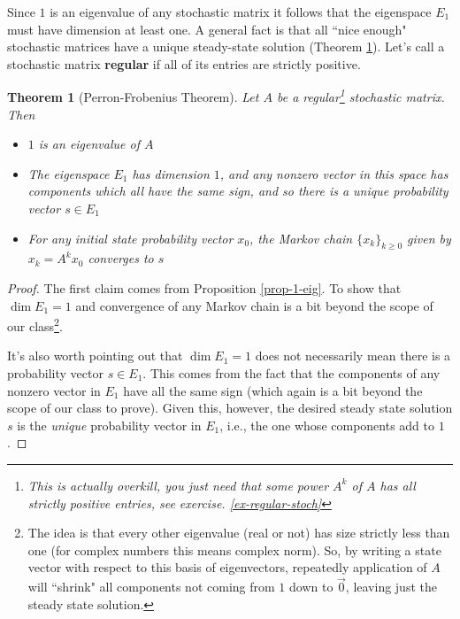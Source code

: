 \documentclass[12pt]{article}
\numberwithin{equation}{subsection}
\numberwithin{figure}{subsection}
\newtheorem{thm}[subsection]{Theorem}
\theoremstyle{note}
\begin{document}
Since $1$ is an eigenvalue of any stochastic matrix it follows that the eigenspace $E_1$ must have dimension at least one. A general fact is that all ``nice enough" stochastic matrices have a unique steady-state solution (Theorem \ref{thm-PF}). Let's call a stochastic matrix \textbf{regular} if all of its entries are strictly positive. 

\begin{thm}[Perron-Frobenius Theorem] \label{thm-PF}
	Let $A$ be a regular\footnote{This is actually overkill, you just need that \textit{some} power $A^k$ of $A$ has all strictly positive entries, see exercise. \ref{ex-regular-stoch}} stochastic matrix. Then
	\begin{itemize}
	\item $1$ is an eigenvalue of $A$
	\item The eigenspace $E_1$ has dimension $1$, and any nonzero vector in this space has components which all have the same sign, and so there is a unique probability vector $s\in E_1$
	\item For any initial state probability vector $x_0$, the Markov chain $\{x_k\}_{k\geq 0}$ given by  $x_k=A^kx_0$  converges to $s$ 
	\end{itemize}
	\end{thm}
\begin{proof}
	The first claim comes from Proposition \ref{prop-1-eig}. To show that $\dim E_1=1$ and convergence of any Markov chain is a bit beyond the scope of our class\footnote{The idea is that every other eigenvalue (real or not) has size strictly less than one (for complex numbers this means complex norm). So, by writing a state vector with respect to this basis of eigenvectors, repeatedly application of $A$ will ``shrink" all components not coming from $1$ down to $\vec{0}$, leaving just the steady state solution.}. 
	
	It's also worth pointing out that $\dim E_1=1$ does not necessarily mean there is a probability vector $s\in E_1$. This comes from the fact that the components of any nonzero vector in $E_1$ have all the same sign (which again is a bit beyond the scope of our class to prove). Given this, however, the desired steady state solution $s$ is the \textit{unique} probability vector in $E_1$, i.e., the one whose components add to $1$. 	
\end{proof}
\end{document}
